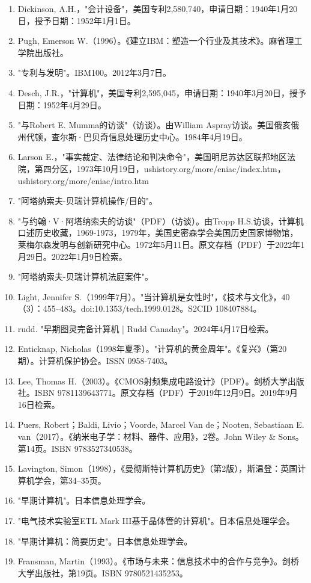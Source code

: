 \begin{enumerate}
\item Dickinson, A.H.，"会计设备"，美国专利2,580,740，申请日期：1940年1月20日，授予日期：1952年1月1日。
\item Pugh, Emerson W.（1996）。《建立IBM：塑造一个行业及其技术》。麻省理工学院出版社。
\item "专利与发明"。IBM100。2012年3月7日。
\item Desch, J.R.，"计算机"，美国专利2,595,045，申请日期：1940年3月20日，授予日期：1952年4月29日。
\item "与Robert E. Mumma的访谈"（访谈）。由William Aspray访谈。美国俄亥俄州代顿，查尔斯·巴贝奇信息处理历史中心。1984年4月19日。
\item Larson E.，"事实裁定、法律结论和判决命令"，美国明尼苏达区联邦地区法院，第四分区，1973年10月19日，ushistory.org/more/eniac/index.htm，ushistory.org/more/eniac/intro.htm
\item "阿塔纳索夫-贝瑞计算机操作/目的"。
\item "与约翰·V·阿塔纳索夫的访谈"（PDF）（访谈）。由Tropp H.S.访谈，计算机口述历史收藏，1969-1973，1979年，美国史密森学会美国历史国家博物馆，莱梅尔森发明与创新研究中心。1972年5月11日。原文存档（PDF）于2022年1月29日。2022年1月9日检索。
\item "阿塔纳索夫-贝瑞计算机法庭案件"。
\item Light, Jennifer S.（1999年7月）。"当计算机是女性时"，《技术与文化》，40（3）：455–483。doi:10.1353/tech.1999.0128。S2CID 108407884。
\item rudd. "早期图灵完备计算机 | Rudd Canaday"。2024年4月17日检索。
\item Enticknap, Nicholas（1998年夏季）。"计算机的黄金周年"。《复兴》（第20期）。计算机保护协会。ISSN 0958-7403。
\item Lee, Thomas H.（2003）。《CMOS射频集成电路设计》（PDF）。剑桥大学出版社。ISBN 9781139643771。原文存档（PDF）于2019年12月9日。2019年9月16日检索。
\item Puers, Robert；Baldi, Livio；Voorde, Marcel Van de；Nooten, Sebastiaan E. van（2017）。《纳米电子学：材料、器件、应用》，2卷。John Wiley & Sons。第14页。ISBN 9783527340538。
\item Lavington, Simon（1998），《曼彻斯特计算机历史》（第2版），斯温登：英国计算机学会，第34–35页。
\item "早期计算机"。日本信息处理学会。
\item "电气技术实验室ETL Mark III基于晶体管的计算机"。日本信息处理学会。
\item "早期计算机：简要历史"。日本信息处理学会。
\item Fransman, Martin（1993）。《市场与未来：信息技术中的合作与竞争》。剑桥大学出版社，第19页。ISBN 9780521435253。

\end{enumerate}
